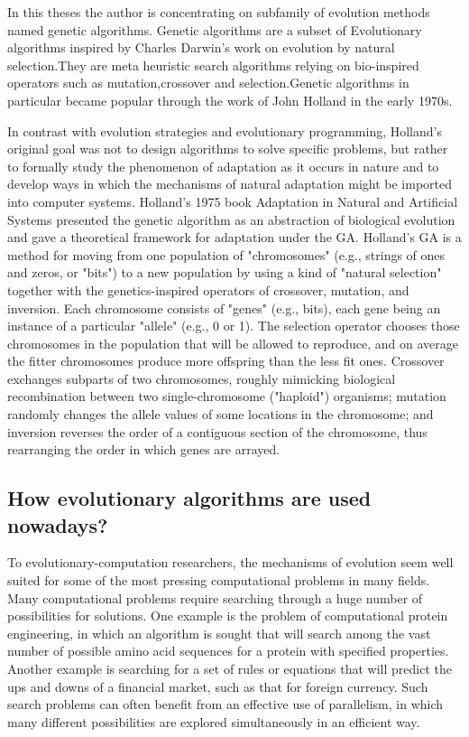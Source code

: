 In this theses the author is concentrating on subfamily of evolution methods named genetic algorithms. Genetic algorithms are a subset of Evolutionary algorithms inspired by Charles Darwin's work on evolution by natural selection.They are meta heuristic search algorithms relying on bio-inspired operators such as mutation,crossover and selection.Genetic algorithms in particular became popular through the work of John Holland in the early 1970s.

In contrast with evolution strategies and evolutionary programming, Holland's original goal was not to design algorithms to solve specific problems, but rather to formally study the phenomenon of adaptation as it occurs in nature and to develop ways in which the mechanisms of natural adaptation might be imported into computer systems. Holland's 1975 book Adaptation in Natural and Artificial Systems presented the genetic algorithm as an abstraction of biological evolution and gave a theoretical framework for adaptation under the GA. Holland's GA is a method for moving from one population of "chromosomes" (e.g., strings of ones and zeros, or "bits") to a new population by using a kind of "natural selection" together with the genetics-inspired operators of crossover, mutation, and inversion. Each chromosome consists of "genes" (e.g., bits), each gene being an instance of a particular "allele" (e.g., 0 or 1). The selection operator chooses those chromosomes in the population that will be allowed to reproduce, and on average the fitter chromosomes produce more offspring than the less fit ones. Crossover exchanges subparts of two chromosomes, roughly mimicking biological recombination between two single-chromosome ("haploid") organisms; mutation randomly changes the allele values of some locations in the chromosome; and inversion reverses the order of a contiguous section of the chromosome, thus rearranging the order in which genes are arrayed. \cite{introduction_to_ga} 

\subsection{How evolutionary algorithms are used nowadays?}
 
To evolutionary-computation researchers, the mechanisms of evolution seem well suited for some of the most pressing computational problems in many fields. Many computational problems require searching through a huge number of possibilities for solutions. One example is the problem of computational protein engineering, in which an algorithm is sought that will search among the vast number of possible amino acid sequences for a protein with specified properties. Another example is searching for a set of rules or equations that will predict the ups and downs of a financial market, such as that for foreign currency. Such search problems can often benefit from an effective use of parallelism, in which many different possibilities are explored simultaneously in an efficient way. \cite{introduction_to_ga}

